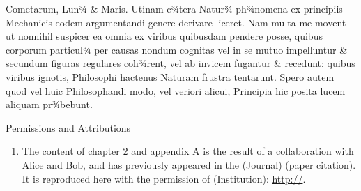 Cometarum, Lun¾ \& Maris. Utinam c¾tera Natur¾ ph¾nomena ex principiis Mechanicis eodem argumentandi genere derivare liceret. Nam multa me movent ut nonnihil suspicer ea omnia ex viribus quibusdam pendere posse, quibus corporum particul¾ per causas nondum cognitas vel in se mutuo impelluntur \& secundum figuras regulares coh¾rent, vel ab invicem fugantur \& recedunt: quibus viribus ignotis, Philosophi hactenus Naturam frustra tentarunt. Spero autem quod vel huic Philosophandi modo, vel veriori alicui, Principia hic posita lucem aliquam pr¾bebunt.

\begin{section}{Permissions and Attributions}
\begin{enumerate}

\item The content of chapter 2 and appendix A is the result of a collaboration with Alice and Bob, and has previously appeared in the (Journal) (paper citation). It is reproduced here with the permission of (Institution): \url{http://}.

\end{enumerate}
\end{section}
